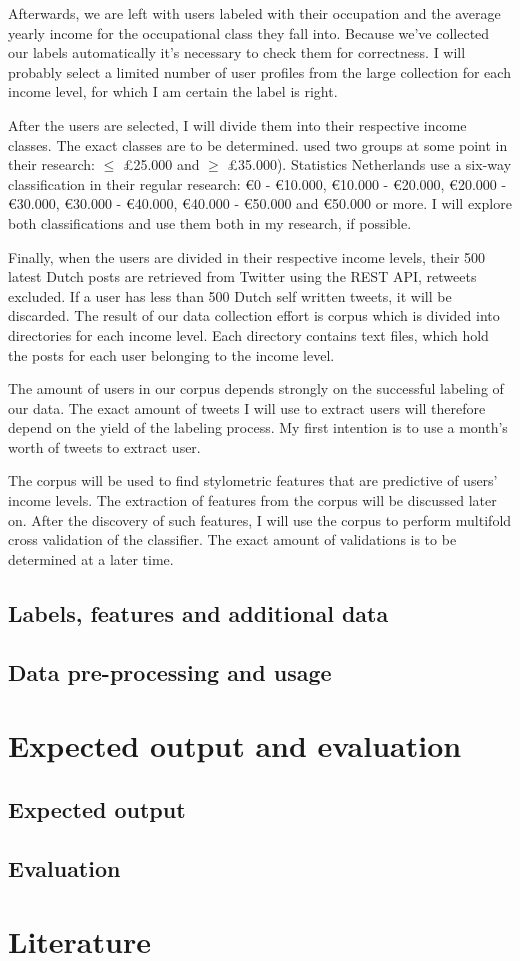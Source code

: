 \documentclass[11pt, a4paper]{article}
\begin{document}
Afterwards, we are left with users labeled with their occupation and the average yearly income for the occupational class they fall into. Because we've collected our labels automatically it's necessary to check them for correctness. I will probably select a limited number of user profiles from the large collection for each income level, for which I am certain the label is right. 

After the users are selected, I will divide them into their respective income classes. The exact classes are to be determined. \citet{flekova} used two groups at some point in their research: $\leq$ \pounds 25.000 and $\geq$ \pounds 35.000). Statistics Netherlands use a six-way classification in their regular research: \euro 0 - \euro 10.000, \euro 10.000 - \euro 20.000, \euro 20.000 - \euro 30.000, \euro 30.000 - \euro 40.000, \euro 40.000 - \euro 50.000 and \euro 50.000 or more. I will explore both classifications and use them both in my research, if possible.

Finally, when the users are divided in their respective income levels, their 500 latest Dutch posts are retrieved from Twitter using the REST API, retweets excluded. If a user has less than 500 Dutch self written tweets, it will be discarded. The result of our data collection effort is corpus which is divided into directories for each income level. Each directory contains text files, which hold the posts for each user belonging to the income level. 

The amount of users in our corpus depends strongly on the successful labeling of our data. The exact amount of tweets I will use to extract users will therefore depend on the yield of the labeling process. My first intention is to use a month's worth of tweets to extract user.

The corpus will be used to find stylometric features that are predictive of users' income levels. The extraction of features from the corpus will be discussed later on. After the discovery of such features, I will use the corpus to perform multifold cross validation of the classifier. The exact amount of validations is to be determined at a later time.

\subsection{Labels, features and additional data}
\citet{codelijsten}
\citet{uurlonen}

\subsection{Data pre-processing and usage}


\section{Expected output and evaluation}
\subsection{Expected output}
\subsection{Evaluation}
\citet{cohen}


\section{Literature}

\end{document}
